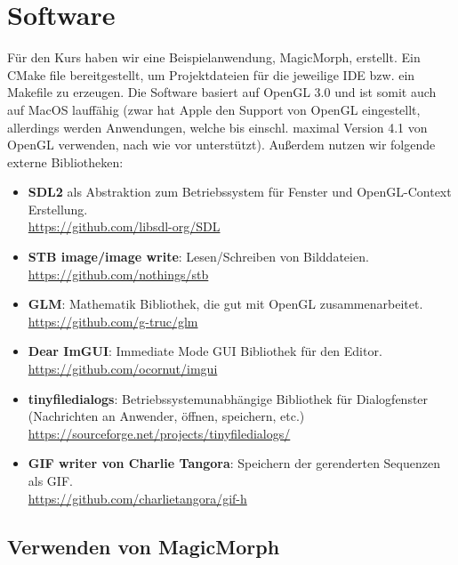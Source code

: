 \chapter{Software}

Für den Kurs haben wir eine Beispielanwendung, MagicMorph, erstellt.
Ein CMake file bereitgestellt, um Projektdateien für die jeweilige IDE
bzw. ein Makefile zu erzeugen. Die Software basiert
auf OpenGL 3.0 und ist somit auch auf MacOS lauffähig (zwar hat Apple
den Support von OpenGL eingestellt, allerdings werden Anwendungen, welche bis
einschl. maximal Version 4.1 von OpenGL verwenden, nach wie vor unterstützt).
Au\ss erdem nutzen wir folgende externe Bibliotheken:

\begin{itemize}
	\item \textbf{SDL2} als Abstraktion zum Betriebssystem für Fenster und OpenGL-Context Erstellung.
	\\\href{https://github.com/libsdl-org/SDL}{https://github.com/libsdl-org/SDL} 
	\item \textbf{STB image/image write}: Lesen/Schreiben von Bilddateien.
		\\\href{https://github.com/nothings/stb}{https://github.com/nothings/stb} 
	\item \textbf{GLM}: Mathematik Bibliothek, die gut mit OpenGL zusammenarbeitet. 
			\\\href{https://github.com/g-truc/glm}{https://github.com/g-truc/glm}
	\item \textbf{Dear ImGUI}: Immediate Mode GUI Bibliothek für den Editor. 
	\\\href{https://github.com/ocornut/imgui}{https://github.com/ocornut/imgui}
	\item \textbf{tinyfiledialogs}: Betriebssystemunabhängige Bibliothek für Dialogfenster (Nachrichten an Anwender, öffnen, speichern, etc.)	\\\href{https://sourceforge.net/projects/tinyfiledialogs/}{https://sourceforge.net/projects/tinyfiledialogs/}
	\item \textbf{GIF writer von Charlie Tangora}: Speichern der gerenderten Sequenzen als GIF.
				\\\href{https://github.com/charlietangora/gif-h}{https://github.com/charlietangora/gif-h} 
\end{itemize}

\section{Verwenden von MagicMorph}

